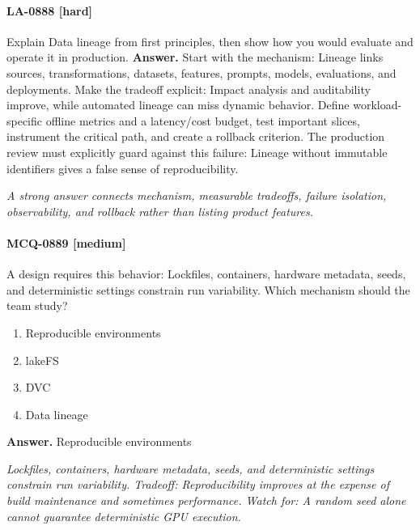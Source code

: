 \paragraph{LA-0888 [hard]} Explain Data lineage from first principles, then show how you would evaluate and operate it in production.
\noindent\textbf{Answer.} Start with the mechanism: Lineage links sources, transformations, datasets, features, prompts, models, evaluations, and deployments. Make the tradeoff explicit: Impact analysis and auditability improve, while automated lineage can miss dynamic behavior. Define workload-specific offline metrics and a latency/cost budget, test important slices, instrument the critical path, and create a rollback criterion. The production review must explicitly guard against this failure: Lineage without immutable identifiers gives a false sense of reproducibility.
\par\textit{A strong answer connects mechanism, measurable tradeoffs, failure isolation, observability, and rollback rather than listing product features.}
\paragraph{MCQ-0889 [medium]} A design requires this behavior: Lockfiles, containers, hardware metadata, seeds, and deterministic settings constrain run variability. Which mechanism should the team study?
\begin{enumerate}[label=\Alph*.]
\item Reproducible environments
\item lakeFS
\item DVC
\item Data lineage
\end{enumerate}
\noindent\textbf{Answer.} Reproducible environments
\par\textit{Lockfiles, containers, hardware metadata, seeds, and deterministic settings constrain run variability. Tradeoff: Reproducibility improves at the expense of build maintenance and sometimes performance. Watch for: A random seed alone cannot guarantee deterministic GPU execution.}
